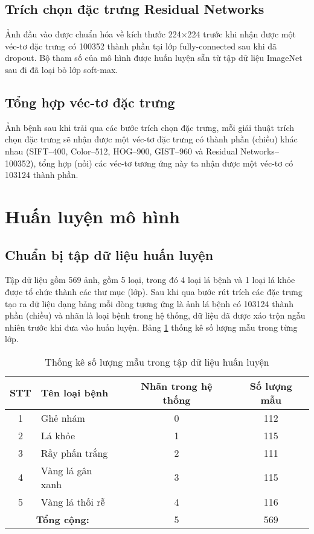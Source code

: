 \subsection{Trích chọn đặc trưng Residual Networks}
Ảnh đầu vào được chuẩn hóa về kích thước 224$\times$224 trước khi nhận được một véc-tơ đặc trưng có 100352 thành phần tại lớp fully-connected sau khi đã dropout. Bộ tham số của mô hình được huấn luyện sẵn từ tập dữ liệu ImageNet sau đi đã loại bỏ lớp soft-max.

\subsection{Tổng hợp véc-tơ đặc trưng}
Ảnh bệnh sau khi trải qua các bước trích chọn đặc trưng, mỗi giải thuật trích chọn đặc trưng sẽ nhận được một véc-tơ đặc trưng có thành phần (chiều) khác nhau (SIFT--400, Color--512, HOG--900, GIST--960 và Residual Networks--100352), tổng hợp (nối) các véc-tơ tương ứng này ta nhận được một véc-tơ có 103124 thành phần.



\section{Huấn luyện mô hình}
\subsection{Chuẩn bị tập dữ liệu huấn luyện}
Tập dữ liệu gồm 569 ảnh, gồm 5 loại, trong đó 4 loại lá bệnh và 1 loại lá khỏe được tổ chức thành các thư mục (lớp). Sau khi qua bước rút trích các đặc trưng tạo ra dữ liệu dạng bảng mỗi dòng tương ứng là ảnh lá bệnh có 103124 thành phần (chiều) và nhãn là loại bệnh trong hệ thống, dữ liệu đã được xáo trộn ngẫu nhiên trước khi đưa vào huấn luyện. Bảng \ref{tab:train-dataset} thống kê số lượng mẫu trong từng lớp.

\begin{table}[h!]
\caption{Thống kê số lượng mẫu trong tập dữ liệu huấn luyện}
\centering
\begin{tabular}{|c|l|c|c|}
\hline
\textbf{STT} & \textbf{Tên loại bệnh} & \textbf{Nhãn trong hệ thống} & \textbf{Số lượng mẫu} \\ [0.5ex]
\hline \hline
1 & Ghẻ nhám & 0 & 112 \\ 
2 & Lá khỏe & 1 & 115 \\ 
3 & Rầy phấn trắng & 2 & 111 \\ 
4 & Vàng lá gân xanh & 3 & 115 \\ 
5 & Vàng lá thối rễ  & 4 & 116 \\ \hline
\multicolumn{2}{|c|}{ \textbf{Tổng cộng:}} & 5 & 569 \\ \hline
\end{tabular}
\label{tab:train-dataset}
\end{table}

